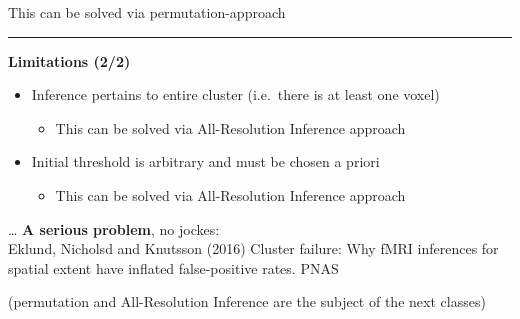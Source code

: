 \documentclass[]{article}
\providecommand{\tightlist}{%
  \setlength{\itemsep}{0pt}\setlength{\parskip}{0pt}}
\begin{document}
This can be solved via permutation-approach

\begin{center}\rule{0.5\linewidth}{\linethickness}\end{center}

\textbf{Limitations (2/2)}

\begin{itemize}
\tightlist
\item
  Inference pertains to entire cluster (i.e.~there is at least one
  voxel)

  \begin{itemize}
  \tightlist
  \item
    This can be solved via All-Resolution Inference approach
  \end{itemize}
\item
  Initial threshold is arbitrary and must be chosen a priori

  \begin{itemize}
  \tightlist
  \item
    This can be solved via All-Resolution Inference approach
  \end{itemize}
\end{itemize}

\ldots{} \textbf{A serious problem}, no jockes:\\
Eklund, Nicholsd and Knutsson (2016) Cluster failure: Why fMRI
inferences for spatial extent have inflated false-positive rates. PNAS

(permutation and All-Resolution Inference are the subject of the next
classes)
\end{document}
